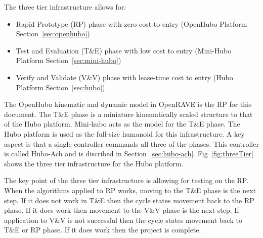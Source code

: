 The three tier infrastructure allows for:
\begin{itemize}
\item Rapid Prototype (RP) phase with zero cost to entry (OpenHubo Platform Section~\ref{sec:openhubo})
\item Test and Evaluation (T\&E) phase with low cost to entry (Mini-Hubo Platform Section~\ref{sec:mini-hubo})
\item Verify and Validate (V\&V) phase with lease-time cost to entry (Hubo Platform Section~\ref{sec:hubo})
\end{itemize}

\cite{threeTier}

The OpenHubo\cite{6385987} kinematic and dynamic model in OpenRAVE\cite{diankovThesis} is the RP for this document.
The T\&E phase is a miniature kinematically scaled structure to that of the Hubo platform.
Mini-hubo\cite{threeTier} acts as the model for the T\&E phase.
The Hubo platform\cite{4058572} is used as the full-size humanoid for this infrastructure.  
A key aspect is that a single controller commands all three of the phases.
This controller is called Hubo-Ach and is discribed in Section~\ref{sec:hubo-ach}.
Fig~\ref{fig:threeTier} shows the three tier infrastructure for the Hubo platform.

The key point of the three tier infrastructure is allowing for testing on the RP.
When the algorithms applied to RP works, moving to the T\&E phase is the next step.
If it does not work in T\&E then the cycle states movement back to the RP phase.
If it does work then movement to the V\&V phase is the next step.
If application to V\&V is not successful then the cycle states movement back to T\&E or RP phase.
If it does work then the project is complete.

